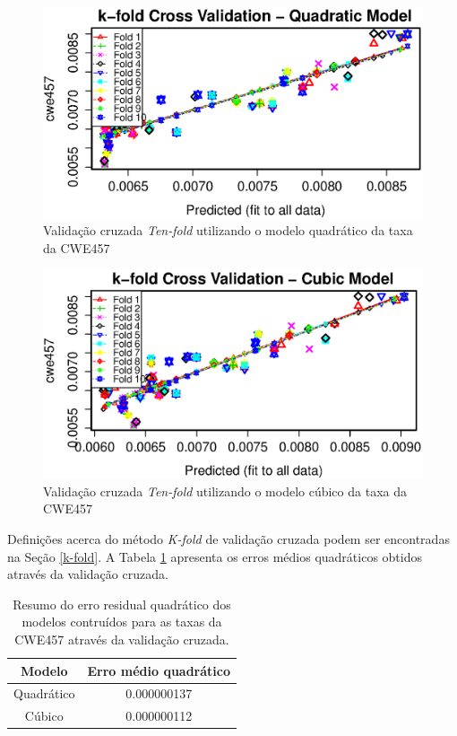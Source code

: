\begin{figure}[h]
  \centering
  \includegraphics[width=1.0\textwidth]
      {figuras/cwe457-k-fold-quadratic.eps}
      \caption{Validação cruzada \textit{Ten-fold} utilizando o modelo
      quadrático da taxa da CWE457}
  \label{fig:cwe457-k-fold-quadratic}
\end{figure}

\begin{figure}[h]
  \centering
  \includegraphics[width=1.0\textwidth]
      {figuras/cwe457-k-fold-cubic.eps}
      \caption{Validação cruzada \textit{Ten-fold} utilizando o modelo
      cúbico da taxa da CWE457}
  \label{fig:cwe457-k-fold-cubic}
\end{figure}

Definições acerca do método \textit{K-fold} de validação cruzada podem ser
encontradas na Seção \ref{k-fold}. A Tabela \ref{tab:cwe457-emq} apresenta os
erros médios quadráticos obtidos através da validação cruzada.

\begin{table}[h]
 \centering
 \begin{tabular}{cc}
  \hline
  \rowcolor[HTML]{EFEFEF} 
  {Modelo} & {Erro médio quadrático} \\ \hline
  Quadrático   & 0.000000137 \\ \hline
  Cúbico       & 0.000000112 \\ \hline
 \end{tabular}
 \caption{Resumo do erro residual quadrático dos modelos contruídos para as taxas da
 CWE457 através da validação cruzada.}
 \label{tab:cwe457-emq}
\end{table}

